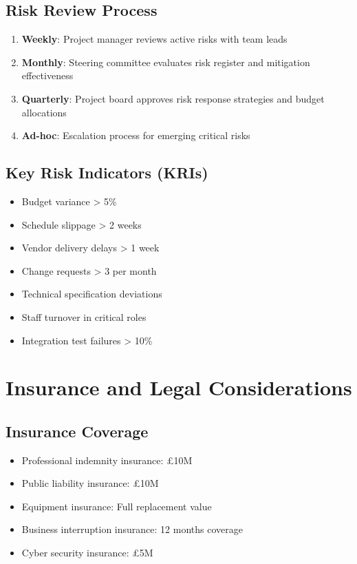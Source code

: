 \subsection{Risk Review Process}

\begin{enumerate}
\item \textbf{Weekly}: Project manager reviews active risks with team leads
\item \textbf{Monthly}: Steering committee evaluates risk register and mitigation effectiveness
\item \textbf{Quarterly}: Project board approves risk response strategies and budget allocations
\item \textbf{Ad-hoc}: Escalation process for emerging critical risks
\end{enumerate}

\subsection{Key Risk Indicators (KRIs)}

\begin{itemize}
\item Budget variance > 5\%
\item Schedule slippage > 2 weeks
\item Vendor delivery delays > 1 week
\item Change requests > 3 per month
\item Technical specification deviations
\item Staff turnover in critical roles
\item Integration test failures > 10\%
\end{itemize}

\section{Insurance and Legal Considerations}

\subsection{Insurance Coverage}
\begin{itemize}
\item Professional indemnity insurance: £10M
\item Public liability insurance: £10M
\item Equipment insurance: Full replacement value
\item Business interruption insurance: 12 months coverage
\item Cyber security insurance: £5M
\end{itemize}

